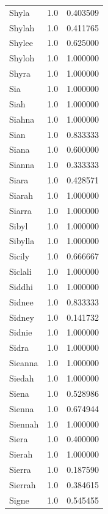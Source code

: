 \documentclass[
  letterpaper,
  DIV=11,
  numbers=noendperiod]{scrreprt}
\begin{document}
\begin{tabular}{lrr}
Shyla           &   1.0 &   0.403509 \\
Shylah          &   1.0 &   0.411765 \\
Shylee          &   1.0 &   0.625000 \\
Shyloh          &   1.0 &   1.000000 \\
Shyra           &   1.0 &   1.000000 \\
Sia             &   1.0 &   1.000000 \\
Siah            &   1.0 &   1.000000 \\
Siahna          &   1.0 &   1.000000 \\
Sian            &   1.0 &   0.833333 \\
Siana           &   1.0 &   0.600000 \\
Sianna          &   1.0 &   0.333333 \\
Siara           &   1.0 &   0.428571 \\
Siarah          &   1.0 &   1.000000 \\
Siarra          &   1.0 &   1.000000 \\
Sibyl           &   1.0 &   1.000000 \\
Sibylla         &   1.0 &   1.000000 \\
Sicily          &   1.0 &   0.666667 \\
Siclali         &   1.0 &   1.000000 \\
Siddhi          &   1.0 &   1.000000 \\
Sidnee          &   1.0 &   0.833333 \\
Sidney          &   1.0 &   0.141732 \\
Sidnie          &   1.0 &   1.000000 \\
Sidra           &   1.0 &   1.000000 \\
Sieanna         &   1.0 &   1.000000 \\
Siedah          &   1.0 &   1.000000 \\
Siena           &   1.0 &   0.528986 \\
Sienna          &   1.0 &   0.674944 \\
Siennah         &   1.0 &   1.000000 \\
Siera           &   1.0 &   0.400000 \\
Sierah          &   1.0 &   1.000000 \\
Sierra          &   1.0 &   0.187590 \\
Sierrah         &   1.0 &   0.384615 \\
Signe           &   1.0 &   0.545455 \\

\end{tabular}
\end{document}

